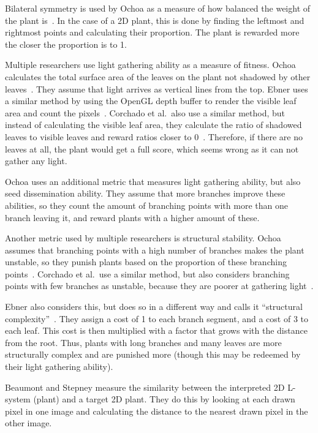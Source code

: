 Bilateral symmetry is used by Ochoa as a measure of how balanced the weight of the plant is~\cite{1998Ochoa}.
In the case of a 2D plant, this is done by finding the leftmost and rightmost points and calculating their proportion.
The plant is rewarded more the closer the proportion is to 1.

Multiple researchers use light gathering ability as a measure of fitness.
Ochoa calculates the total surface area of the leaves on the plant not shadowed by other leaves~\cite{1998Ochoa}.
They assume that light arrives as vertical lines from the top.
Ebner uses a similar method by using the OpenGL depth buffer to render the visible leaf area and count the pixels~\cite{2003Ebner}.
Corchado et al.\ also use a similar method, but instead of calculating the visible leaf area, they calculate the ratio of shadowed leaves to visible leaves and reward ratios closer to 0~\cite{2009Corchado}.
Therefore, if there are no leaves at all, the plant would get a full score, which seems wrong as it can not gather any light.

Ochoa uses an additional metric that measures light gathering ability, but also seed dissemination ability.
They assume that more branches improve these abilities, so they count the amount of branching points with more than one branch leaving it, and reward plants with a higher amount of these.~\cite{1998Ochoa}

Another metric used by multiple researchers is structural stability.
Ochoa assumes that branching points with a high number of branches makes the plant unstable, so they punish plants based on the proportion of these branching points~\cite{1998Ochoa}.
Corchado et al.\ use a similar method, but also considers branching points with few branches as unstable, because they are poorer at gathering light~\cite{2009Corchado}.

Ebner also considers this, but does so in a different way and calls it ``structural complexity''~\cite{2003Ebner}.
They assign a cost of 1 to each branch segment, and a cost of 3 to each leaf.
This cost is then multiplied with a factor that grows with the distance from the root.
Thus, plants with long branches and many leaves are more structurally complex and are punished more (though this may be redeemed by their light gathering ability).

Beaumont and Stepney measure the similarity between the interpreted 2D \gls{L-system} (plant) and a target 2D plant.
They do this by looking at each drawn pixel in one image and calculating the distance to the nearest drawn pixel in the other image.

